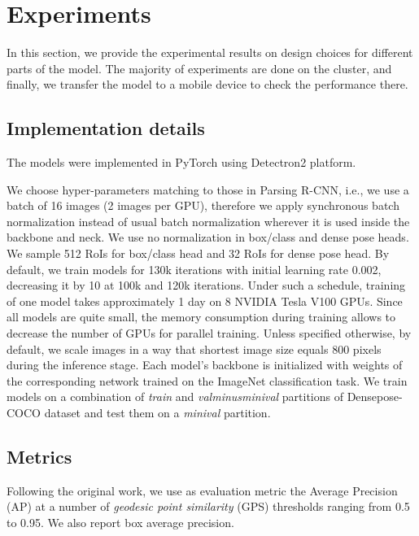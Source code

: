 \section{Experiments}

In this section, we provide the experimental results on design choices for different parts of the model. The majority of experiments are done on the cluster, and finally, we transfer the model to a mobile device to check the performance there.

\subsection{Implementation details}

The models were implemented in PyTorch using Detectron2 \cite{detectron2} platform.

We choose hyper-parameters matching to those in Parsing R-CNN\cite{parsing}, i.e., we use a batch of 16 images (2 images per GPU), therefore we apply synchronous batch normalization \cite{syncbn} instead of usual batch normalization wherever it is used inside the backbone and neck. We use no normalization in box/class and dense pose heads. We sample 512 RoIs for box/class head and 32 RoIs for dense pose head. By default, we train models for 130k iterations with initial learning rate 0.002, decreasing it by 10 at 100k and 120k iterations. Under such a schedule, training of one model takes approximately 1 day on 8 NVIDIA Tesla V100 GPUs. Since all models are quite small, the memory consumption during training allows to decrease the number of GPUs for parallel training. Unless specified otherwise, by default, we scale images in a way that shortest image size equals 800 pixels during the inference stage. Each model's backbone is initialized with weights of the corresponding network trained on the ImageNet classification task. We train models on a combination of \textit{train} and \textit{valminusminival} partitions of Densepose-COCO dataset \cite{densepose} and test them on a \textit{minival} partition.


\subsection{Metrics}
Following the original work, we use as evaluation metric the Average Precision (AP) at a number of \textit{geodesic point similarity} (GPS) thresholds ranging from 0.5 to 0.95. We also report box average precision.

